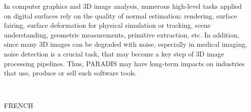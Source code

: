 \documentclass[french]{article}
\begin{document}
In computer graphics and 3D image analysis, 
numerous high-level tasks applied on digital surfaces 
rely on the quality of normal estimation: 
rendering, surface fairing, surface deformation 
for physical simulation or tracking, scene understanding, 
geometric measurements, primitive extraction, etc. 
In addition, since many 3D images can be degraded with noise, 
especially in medical imaging, noise detection is a crucial task,  
that may become a key step of 3D image processing pipelines.  
Thus, PARADIS may have long-term impacts on industries 
that use, produce or sell such software tools. 


~

FRENCH

~

~

  
\end{document}
